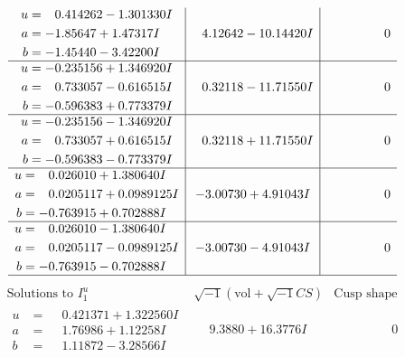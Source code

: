 \documentclass[1p]{elsarticle_modified}
\theoremstyle{definition}
\newcommand{\I}{\sqrt{-1}}
\begin{document}
$$\begin{array}{c|c|c}
\begin{aligned}
u &= \phantom{-}0.414262 - 1.301330 I \\
a &= -1.85647 + 1.47317 I \\
b &= -1.45440 - 3.42200 I\end{aligned}
 & \phantom{-}4.12642 - 10.14420 I & \phantom{-0.000000 } 0 \\ \hline\begin{aligned}
u &= -0.235156 + 1.346920 I \\
a &= \phantom{-}0.733057 - 0.616515 I \\
b &= -0.596383 + 0.773379 I\end{aligned}
 & \phantom{-}0.32118 - 11.71550 I & \phantom{-0.000000 } 0 \\ \hline\begin{aligned}
u &= -0.235156 - 1.346920 I \\
a &= \phantom{-}0.733057 + 0.616515 I \\
b &= -0.596383 - 0.773379 I\end{aligned}
 & \phantom{-}0.32118 + 11.71550 I & \phantom{-0.000000 } 0 \\ \hline\begin{aligned}
u &= \phantom{-}0.026010 + 1.380640 I \\
a &= \phantom{-}0.0205117 + 0.0989125 I \\
b &= -0.763915 + 0.702888 I\end{aligned}
 & -3.00730 + 4.91043 I & \phantom{-0.000000 } 0 \\ \hline\begin{aligned}
u &= \phantom{-}0.026010 - 1.380640 I \\
a &= \phantom{-}0.0205117 - 0.0989125 I \\
b &= -0.763915 - 0.702888 I\end{aligned}
 & -3.00730 - 4.91043 I & \phantom{-0.000000 } 0\\
 \hline 
 \end{array}$$\newpage$$\begin{array}{c|c|c}  
\text{Solutions to }I^u_{1}& \I (\text{vol} + \sqrt{-1}CS) & \text{Cusp shape}\\
 \hline 
\begin{aligned}
u &= \phantom{-}0.421371 + 1.322560 I \\
a &= \phantom{-}1.76986 + 1.12258 I \\
b &= \phantom{-}1.11872 - 3.28566 I\end{aligned}
 & \phantom{-}9.3880 + 16.3776 I & \phantom{-0.000000 } 0 \\ \hline\begin{aligned}

\end{aligned}
\end{array}$$
\end{document}
